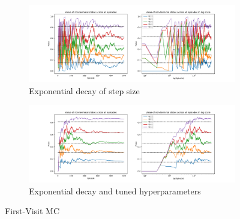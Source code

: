 \begin{enumerate}
    \begin{figure}[h]
        \centering
        \begin{subfigure}[b]{0.8\textwidth}
            \includegraphics[width=\textwidth]{images/mc_td/first_visit_exponential_0.5_0.01_episode_values.pdf}
            \caption{Exponential decay of step size}
            \label{fig:default_fvmc}
        \end{subfigure}

        \begin{subfigure}[b]{0.8\textwidth}
            \includegraphics[width=\textwidth]{images/mc_td/first_visit_exponential_0.1_0.0008_episode_values.pdf}
            \caption{Exponential decay and tuned hyperparameters}
            \label{fig:tuned_fvmc}
        \end{subfigure}
        \caption{First-Visit MC}
    \end{figure}


\end{enumerate}
